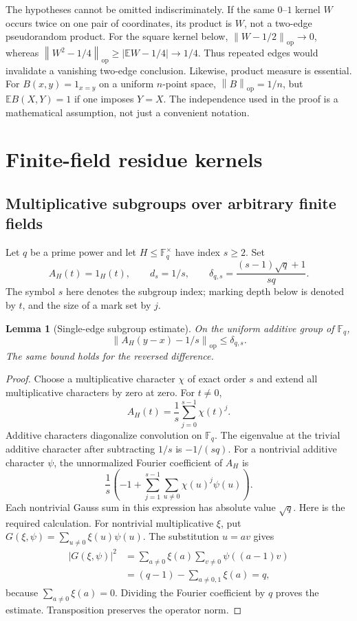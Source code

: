 \documentclass[11pt,a4paper]{article}
\numberwithin{equation}{section}
\newtheorem{lemma}[theorem]{Lemma}
\theoremstyle{definition}
\theoremstyle{remark}
\newcommand{\E}{\mathbb E}
\newcommand{\F}{\mathbb F}
\newcommand{\op}{\mathrm{op}}
\newcommand{\norm}[1]{\left\lVert #1\right\rVert}
\begin{document}
The hypotheses cannot be omitted indiscriminately. If the same
$0$--$1$ kernel $W$ occurs twice on one pair of coordinates, its product
is $W$, not a two-edge pseudorandom product. For the square kernel below,
$\norm{W-1/2}_{\op}\to0$, whereas
$\norm{W^2-1/4}_{\op}\ge|\E W-1/4|\to1/4$.
Thus repeated edges would invalidate a vanishing two-edge conclusion.
Likewise, product measure is essential. For
$B(x,y)=1_{x=y}$ on a uniform $n$-point space,
$\norm B_{\op}=1/n$, but $\E B(X,Y)=1$ if one imposes $Y=X$.
The independence used in the proof is a mathematical assumption, not
just a convenient notation.

\section{Finite-field residue kernels}
\label{sec:fields}

\subsection{Multiplicative subgroups over arbitrary finite fields}

Let $q$ be a prime power and let $H\le\F_q^\times$ have index
$s\ge2$. Set
\[
 A_H(t)=1_H(t),\qquad d_s=1/s,\qquad
 \delta_{q,s}=\frac{(s-1)\sqrt q+1}{sq}.
\]
The symbol $s$ here denotes the subgroup index; marking depth below is
denoted by $t$, and the size of a mark set by $j$.

\begin{lemma}[Single-edge subgroup estimate]
\label{lem:subgroup}
On the uniform additive group of $\F_q$,
\[
 \norm{A_H(y-x)-1/s}_{\op}\le\delta_{q,s}.
\]
The same bound holds for the reversed difference.
\end{lemma}
\begin{proof}
Choose a multiplicative character $\chi$ of exact order $s$ and
extend all multiplicative characters by zero at zero. For $t\ne0$,
\[
 A_H(t)=\frac1s\sum_{j=0}^{s-1}\chi(t)^j.
\]
Additive characters diagonalize convolution on $\F_q$. The eigenvalue
at the trivial additive character after subtracting $1/s$ is $-1/(sq)$.
For a nontrivial additive character $\psi$, the unnormalized Fourier
coefficient of $A_H$ is
\[
 \frac1s\left(-1+\sum_{j=1}^{s-1}
            \sum_{u\ne0}\chi(u)^j\psi(u)\right).
\]
Each nontrivial Gauss sum in this expression has absolute value $\sqrt q$.
Here is the required calculation. For nontrivial multiplicative $\xi$,
put $G(\xi,\psi)=\sum_{u\ne0}\xi(u)\psi(u)$. The substitution $u=av$
gives
\begin{align*}
 |G(\xi,\psi)|^2
 &=\sum_{a\ne0}\xi(a)\sum_{v\ne0}\psi((a-1)v)\\
 &=(q-1)-\sum_{a\ne0,1}\xi(a)=q,
\end{align*}
because $\sum_{a\ne0}\xi(a)=0$. Dividing the Fourier coefficient by
$q$ proves the estimate. Transposition preserves the operator norm.
\end{proof}
\end{document}

